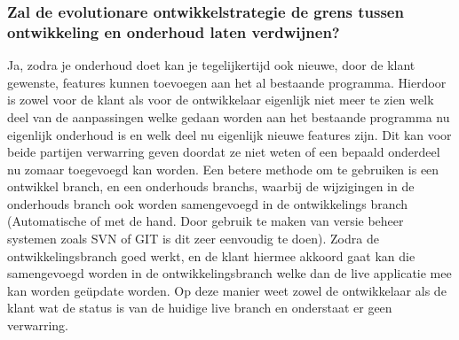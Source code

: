 \documentclass[a4paper,titlepage]{artikel1}
\begin{document}
   \subsubsection[Opdracht 5]{Zal de evolutionare ontwikkelstrategie de grens tussen ontwikkeling en onderhoud laten verdwijnen?}
   Ja, zodra je onderhoud doet kan je tegelijkertijd ook nieuwe, door de klant gewenste, features kunnen toevoegen aan het al bestaande programma. Hierdoor is zowel voor de klant als voor de ontwikkelaar eigenlijk niet meer te zien welk deel van de aanpassingen welke gedaan worden aan het bestaande programma nu eigenlijk onderhoud is en welk deel nu eigenlijk nieuwe features zijn. Dit kan voor beide partijen verwarring geven doordat ze niet weten of een bepaald onderdeel nu zomaar toegevoegd kan worden. Een betere methode om te gebruiken is een ontwikkel branch, en een onderhouds branchs, waarbij de wijzigingen in de onderhouds branch ook worden samengevoegd in de ontwikkelings branch (Automatische of met de hand. Door gebruik te maken van versie beheer systemen zoals SVN of GIT is dit zeer eenvoudig te doen). Zodra de ontwikkelingsbranch goed werkt, en de klant hiermee akkoord gaat kan die samengevoegd worden in de ontwikkelingsbranch welke dan de live applicatie mee kan worden ge\"{u}pdate worden. Op deze manier weet zowel de ontwikkelaar als de klant wat de status is van de huidige live branch en onderstaat er geen verwarring.
   
\end{document}
